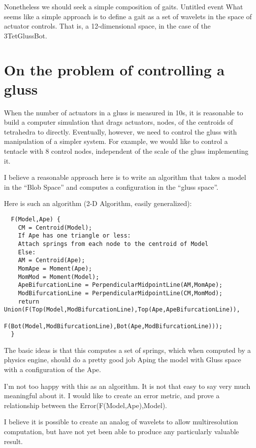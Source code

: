 \documentclass[11pt]{article}
\begin{document}
Nonetheless we should seek a simple composition of gaits.
Untitled event
What seems like a simple approach is to define a gait as a set of wavelets in the space
of actuator controls.  That is, a 12-dimensional space, in the case of the 3TetGlussBot.

\section{On the problem of controlling a gluss}

When the number of actuators in a gluss is measured in 10s, it is reasonable to build a computer simulation
that drags actuators, nodes, of the centroids of tetrahedra to directly.
Eventually, however, we need to control the gluss with manipulation of a simpler system.
For example, we would like to control a tentacle with 8 control nodes, independent of the scale of the
gluss implementing it.

I believe a reasonable approach here is to write an algorithm that takes a model in the ``Blob Space''
and computes a configuration in the ``gluss space''.

Here is such an algorithm (2-D Algorithm, easily generalized):

\begin{lstlisting}
  F(Model,Ape) {
    CM = Centroid(Model);
    If Ape has one triangle or less:
    Attach springs from each node to the centroid of Model
    Else:
    AM = Centroid(Ape);
    MomApe = Moment(Ape);
    MomMod = Moment(Model);
    ApeBifurcationLine = PerpendicularMidpointLine(AM,MomApe);
    ModBifurcationLine = PerpendicularMidpointLine(CM,MomMod);
    return Union(F(Top(Model,ModBifurcationLine),Top(Ape,ApeBifurcationLine)),
                 F(Bot(Model,ModBifurcationLine),Bot(Ape,ModBifurcationLine)));
  }
\end{lstlisting}

The basic ideas is that this computes a set of springs, which when computed by a physics engine, should
do a pretty good job Aping the model with Gluss space with a configuration of the Ape.

I'm not too happy with this as an algorithm. It is not that easy to say very much meaningful about it.
I would like to create an error metric, and prove a relationship between the Error(F(Model,Ape),Model).

I believe it is possible to create an analog of wavelets to allow multiresolution computation, but
have not yet been able to produce any particularly valuable result.
\end{document}
